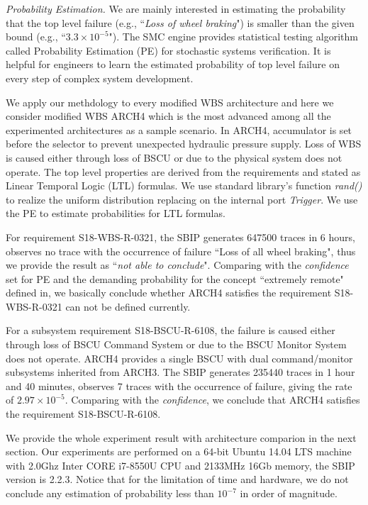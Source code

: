 \emph{Probability Estimation.}
We are mainly interested in estimating the probability that the top level failure (e.g., ``\emph{Loss of wheel braking}") is smaller than the given bound (e.g., ``$3.3\times10^{-5}$"). The SMC engine provides statistical testing algorithm called Probability Estimation (PE)\cite{vmcai04} for stochastic systems verification. It is helpful for engineers to learn the estimated probability of top level failure on every step of complex system development.

We apply our methdology to every modified WBS architecture and here we consider modified WBS ARCH4 which is the most advanced among all the experimented architectures as a sample scenario.
In ARCH4, accumulator is set before the selector to prevent unexpected hydraulic pressure supply. Loss of WBS is caused either through loss of BSCU or due to the physical system does not operate. The top level properties are derived from the requirements and stated as Linear Temporal Logic (LTL) formulas. We use standard library's function \emph{rand()} to realize the uniform distribution\cite{uniform} replacing on the internal port \emph{Trigger}. We use the PE to estimate probabilities for LTL formulas. 

For requirement S18-WBS-R-0321, the SBIP generates 647500 traces in 6 hours, observes no trace with the occurrence of failure ``Loss of all wheel braking", thus we provide the result as ``\emph{not able to conclude}". Comparing with the \emph{confidence} set for PE and the demanding probability for the concept ``extremely remote" defined in\cite{ac}, we basically conclude whether ARCH4 satisfies the requirement S18-WBS-R-0321 can not be defined currently.

For a subsystem requirement S18-BSCU-R-6108, the failure is caused either through loss of BSCU Command System or due to the BSCU Monitor System does not operate. ARCH4 provides a single BSCU with dual command/monitor subsystems inherited from ARCH3. The SBIP generates 235440 traces in 1 hour and 40 minutes, observes 7 traces with the occurrence of failure, giving the rate of $2.97\times10^{-5}$. Comparing with the \emph{confidence}, we conclude that ARCH4 satisfies the requirement S18-BSCU-R-6108.

We provide the whole experiment result with architecture comparion in the next section. Our experiments are performed on a 64-bit Ubuntu 14.04 LTS machine with 2.0Ghz Inter CORE i7-8550U CPU and 2133MHz 16Gb memory, the SBIP version is 2.2.3. Notice that for the limitation of time and hardware, we do not conclude any estimation of probability less than $10^{-7}$ in order of magnitude.

